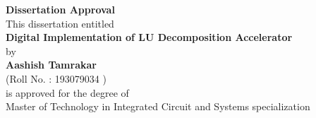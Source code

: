 \begin{Approval}
\noindent

\begin{center}
    {\Large \textbf{Dissertation Approval}}\\
\vspace{10 mm}
This dissertation entitled \\
\vspace{5 mm}
{\large \textbf{Digital Implementation of LU Decomposition Accelerator}} \\
\vspace{5 mm}
by \\
\vspace{5 mm}
\textbf{Aashish Tamrakar} \\
(Roll No. : 193079034 ) \\
\vspace{7 mm}
is approved for the degree of \\
Master of Technology in Integrated Circuit and Systems specialization
\end{center}
%
%
%
%
%
%
\vspace{0.8 in}

\end{Approval}

